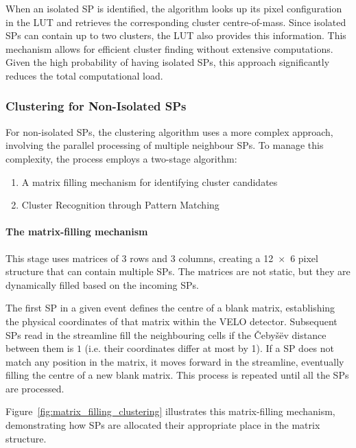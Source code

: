 When an isolated SP is identified, the algorithm looks up its pixel configuration in the LUT and retrieves the corresponding cluster centre-of-mass. Since isolated SPs can contain up to two clusters, the LUT also provides this information. This mechanism allows for efficient cluster finding without extensive computations. Given the high probability of having isolated SPs, this approach significantly reduces the total computational load.

\subsubsection{Clustering for Non-Isolated SPs}
For non-isolated SPs, the clustering algorithm uses a more complex approach, involving the parallel processing of multiple neighbour SPs. To manage this complexity, the process employs a two-stage algorithm\cite{Lazzari:2813167}:
\begin{enumerate}
    \item A matrix filling mechanism for identifying cluster candidates
    \item Cluster Recognition through Pattern Matching
\end{enumerate}

\paragraph{The matrix-filling mechanism}
This stage uses matrices of 3 rows and 3 columns, creating a 12~×~6 pixel structure that can contain multiple SPs. The matrices are not static, but they are dynamically filled based on the incoming SPs.

The first SP in a given event defines the centre of a blank matrix, establishing the physical coordinates of that matrix within the VELO detector. Subsequent SPs read in the streamline fill the neighbouring cells if the Čebyšëv distance between them is $1$ (i.e. their coordinates differ at most by 1). If a SP does not match any position in the matrix, it moves forward in the streamline, eventually filling the centre of a new blank matrix. This process is repeated until all the SPs are processed.

Figure~\ref{fig:matrix_filling_clustering} illustrates this matrix-filling mechanism, demonstrating how SPs are allocated their appropriate place in the matrix structure.

